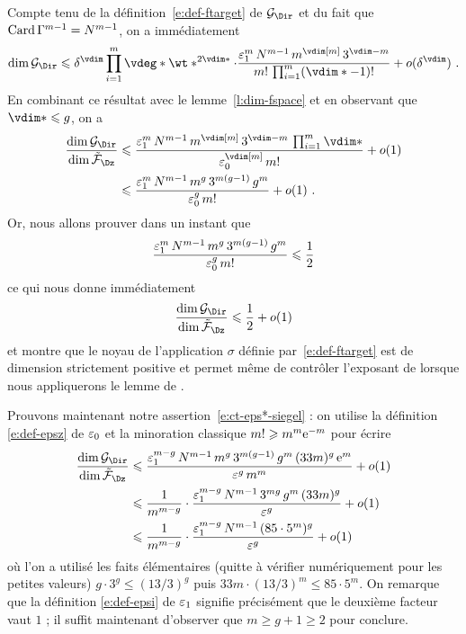 Compte tenu de la définition~\eqref{e:def-ftarget} de \( \ftarget \) et du
fait que \( \operatorname{Card} \Gamma^{m-1} = N^{m-1} \), on a
immédiatement
\begin{equation}
  \dim \ftarget
  \le
  \delta^\vdim
  \prod\fctrange \vdeg* \wt*^{2\vdim*}
  \cdot
  \frac {
    \epsi^m
    \, \nclmaps^{m-1}
    \, m^{\vdim[m]}
    \, 3^{\vdim - m}
  }{
    m!
    \, \prod\fctrange (\vdim* - 1)!
  }
  + o(\delta^\vdim)
  \pmm.
\end{equation}
En combinant ce résultat avec le lemme~\vref{l:dim-fspace} et en observant que
\( \vdim* \le g \), on a
\begin{align}
  \frac {\dim \ftarget} {\dim \fspace}
  & \le
  \frac {
    \epsi^m
    \, \nclmaps^{m-1}
    \, m^{\vdim[m]}
    \, 3^{\vdim - m}
    \, \prod\fctrange \vdim*
  }{
    \epsz^{\vdim[m]}
    \, m!
  }
  + o(1)
  \\ & \le
  \frac {
    \epsi^m
    \, \nclmaps^{m-1}
    \, m ^{g}
    \, 3 ^{m (g-1)}
    \, g^m
  }{
    \epsz^g
    \, m!
  }
  + o(1)
  \pmm.
\end{align}
Or, nous allons prouver dans un instant que
\begin{equation} \label{e:ct-eps*-siegel}
  \frac {
    \varepsilon\sb1^m
    \, N^{m-1}
    \, m ^{g}
    \, 3 ^{m (g-1)}
    \, g^m
  }{
    \varepsilon\sb0^g
    \, m!
  }
  \leqslant
  \frac12
\end{equation}
ce qui nous donne immédiatement
\begin{equation} \label{e:good-codim}
  \frac {\dim \ftarget} {\dim \fspace}
  \le
  \frac12
  + o(1)
\end{equation}
et montre que le noyau de l'application \( \sigma \) définie
par~\eqref{e:def-ftarget} est de dimension strictement positive et permet même
de contrôler l'exposant de  lorsque nous appliquerons le lemme
de \TS.

Prouvons maintenant notre assertion~\eqref{e:ct-eps*-siegel} :
on utilise la définition \eqref{e:def-epsz} de \( \varepsilon\sb0 \) et la minoration
classique \( m! \geqslant m^m \mathrm e^{-m} \) pour écrire
\begin{align}
  \frac {\dim \ftarget} {\dim \fspace}
  & \le
  \frac {
    \epsi^{m-g}
    \, \nclmaps^{m-1}
    \, m ^{g}
    \, 3 ^{m (g-1)}
    \, g^m
    \, (33m)^g
    \, \expb^m
  }{
    \eps^g
    \, m^m
  }
  + o(1)
  \\ & \le
  \frac 1 { m^{m-g} }
  \cdot
  \frac {
    \epsi^{m-g}
    \, \nclmaps^{m-1}
    \, 3 ^{m g}
    \, g^m
    \, (33m)^g
  }{
    \eps^g
  }
  + o(1)
  \\ & \le
  \frac 1 { m^{m-g} }
  \cdot
  \frac {
    \epsi^{m-g}
    \, \nclmaps^{m-1}
    \, (85 \cdot 5^m)^g
  }{
    \eps^g
  }
  + o(1)
\end{align}
où l'on a utilisé les faits élémentaires (quitte à vérifier numériquement pour
les petites valeurs) \( g \cdot 3^g \le (13/3)^g \) puis \( 33
  m \cdot (13/3)^m \le 85 \cdot 5^m \).  On remarque que la
définition \eqref{e:def-epsi} de \( \varepsilon\sb1 \) signifie précisément que le
deuxième facteur vaut \( 1 \) ; il suffit maintenant d'observer que \( m
  \ge g + 1 \ge 2 \) pour conclure.

